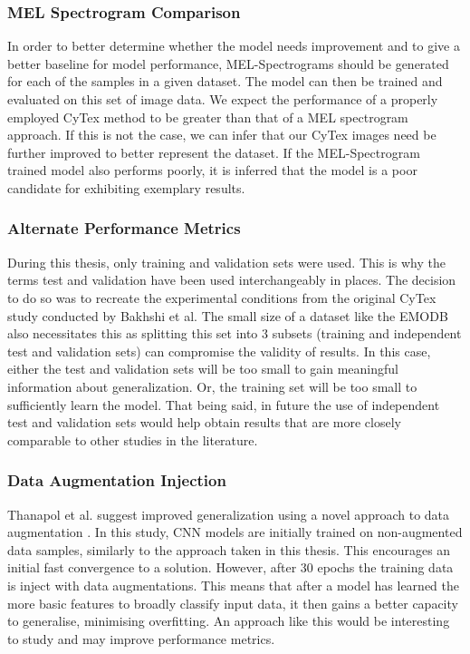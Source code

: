 \subsubsection{MEL Spectrogram Comparison}
In order to better determine whether the model needs improvement and to give a better baseline for model performance, MEL-Spectrograms should be generated for each of the samples in a given dataset. The model can then be trained and evaluated on this set of image data. We expect the performance of a properly employed CyTex method to be greater than that of a MEL spectrogram approach. If this is not the case, we can infer that our CyTex images need be further improved to better represent the dataset. If the MEL-Spectrogram trained model also performs poorly, it is inferred that the model is a poor candidate for exhibiting exemplary results.

\subsubsection{Alternate Performance Metrics}
During this thesis, only training and validation sets were used. This is why the terms test and validation have been used interchangeably in places. The decision to do so was to recreate the experimental conditions from the original CyTex study conducted by Bakhshi et al. The small size of a dataset like the EMODB also necessitates this as splitting this set into 3 subsets (training and independent test and validation sets) can compromise the validity of results. In this case, either the test and validation sets will be too small to gain meaningful information about generalization. Or, the training set will be too small to sufficiently learn the model. That being said, in future the use of independent test and validation sets would help obtain results that are more closely comparable to other studies in the literature.

\subsubsection{Data Augmentation Injection}
Thanapol et al. suggest improved generalization using a novel approach to data augmentation \cite{Thanapol2020}. In this study, CNN models are initially trained on non-augmented data samples, similarly to the approach taken in this thesis. This encourages an initial fast convergence to a solution. However, after 30 epochs the training data is inject with data augmentations. This means that after a model has learned the more basic features to broadly classify input data, it then gains a better capacity to generalise, minimising overfitting. An approach like this would be interesting to study and may improve performance metrics.

